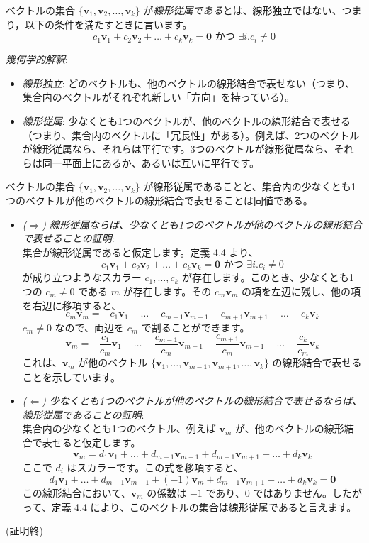\begin{dfn}[線形従属]
ベクトルの集合 $\{\bm{v}_1, \bm{v}_2, \ldots, \bm{v}_k\}$ が\emph{線形従属である}とは、線形独立ではない、つまり，以下の条件を満たすときに言います。
\[c_1 \bm{v}_1 + c_2 \bm{v}_2 + \dots + c_k \bm{v}_k = \bm{0}\text{ かつ }\exists i. c_i\neq0\]
\end{dfn}

\emph{幾何学的解釈}:
\begin{itemize}
\item \emph{線形独立}: どのベクトルも、他のベクトルの線形結合で表せない（つまり、集合内のベクトルがそれぞれ新しい「方向」を持っている）。
\item \emph{線形従属}: 少なくとも1つのベクトルが、他のベクトルの線形結合で表せる（つまり、集合内のベクトルに「冗長性」がある）。例えば、2つのベクトルが線形従属なら、それらは平行です。3つのベクトルが線形従属なら、それらは同一平面上にあるか、あるいは互いに平行です。
\end{itemize}

\begin{thm}[線形従属の判定条件]
ベクトルの集合 $\{\bm{v}_1, \bm{v}_2, \ldots, \bm{v}_k\}$ が線形従属であることと、集合内の少なくとも1つのベクトルが他のベクトルの線形結合で表せることは同値である。
\begin{proof*}
\begin{itemize}
	\item \emph{($\Rightarrow$) 線形従属ならば、少なくとも1つのベクトルが他のベクトルの線形結合で表せることの証明}:\\
    集合が線形従属であると仮定します。定義 4.4 より、
    \[c_1 \bm{v}_1 + c_2 \bm{v}_2 + \dots + c_k \bm{v}_k = \bm{0}\text{ かつ }\exists i. c_i\neq0\]
    が成り立つようなスカラー $c_1, \ldots, c_k$ が存在します。このとき、少なくとも1つの $c_m \neq 0$ である $m$ が存在します。その $c_m \bm{v}_m$ の項を左辺に残し、他の項を右辺に移項すると、
    \[c_m \bm{v}_m = -c_1 \bm{v}_1 - \dots - c_{m-1} \bm{v}_{m-1} - c_{m+1} \bm{v}_{m+1} - \dots - c_k \bm{v}_k\]
    $c_m \neq 0$ なので、両辺を $c_m$ で割ることができます。
    \[\bm{v}_m = -\frac{c_1}{c_m} \bm{v}_1 - \dots - \frac{c_{m-1}}{c_m} \bm{v}_{m-1} - \frac{c_{m+1}}{c_m} \bm{v}_{m+1} - \dots - \frac{c_k}{c_m} \bm{v}_k\]
    これは、$\bm{v}_m$ が他のベクトル $\{\bm{v}_1, \ldots, \bm{v}_{m-1}, \bm{v}_{m+1}, \ldots, \bm{v}_k\}$ の線形結合で表せることを示しています。
	\item \emph{($\Leftarrow$) 少なくとも1つのベクトルが他のベクトルの線形結合で表せるならば、線形従属であることの証明}:\\
	集合内の少なくとも1つのベクトル、例えば $\bm{v}_m$ が、他のベクトルの線形結合で表せると仮定します。
    \[\bm{v}_m = d_1 \bm{v}_1 + \dots + d_{m-1} \bm{v}_{m-1} + d_{m+1} \bm{v}_{m+1} + \dots + d_k \bm{v}_k\]
    ここで $d_i$ はスカラーです。この式を移項すると、
    \[d_1 \bm{v}_1 + \dots + d_{m-1} \bm{v}_{m-1} + (-1)\bm{v}_m + d_{m+1} \bm{v}_{m+1} + \dots + d_k \bm{v}_k = \bm{0}\]
    この線形結合において、$\bm{v}_m$ の係数は $-1$ であり、$0$ ではありません。したがって、定義 4.4 により、このベクトルの集合は線形従属であると言えます。
\end{itemize}
(証明終)
\end{proof*}
\end{thm}

